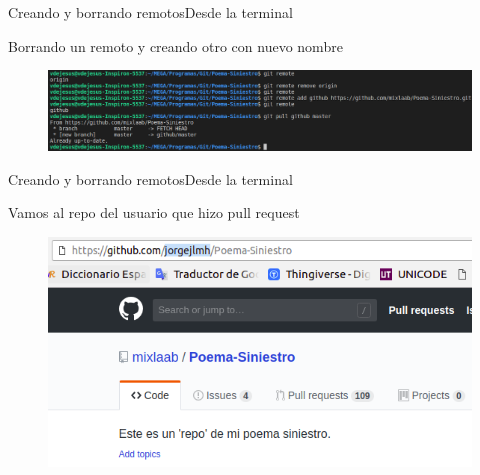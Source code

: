 \documentclass[10pt]{beamer}
\begin{document}
\begin{frame}{Creando y borrando remotos}{Desde la terminal}

  \begin{block}{Borrando un remoto y creando otro con nuevo nombre}
  
  \begin{figure}[h!]
  \centering
  \includegraphics [scale=0.24]{step5}
  \label{fig:step5}
  \end{figure}
      
  \end{block}
  
\end{frame}

\begin{frame}{Creando y borrando remotos}{Desde la terminal}

  \begin{block}{Vamos al repo del usuario que hizo pull request}
  
  \begin{figure}[h!]
  \centering
  \includegraphics [scale=0.34]{step6}
  \label{fig:step6}
  \end{figure}
      
  \end{block}
  
\end{frame}
\end{document}
